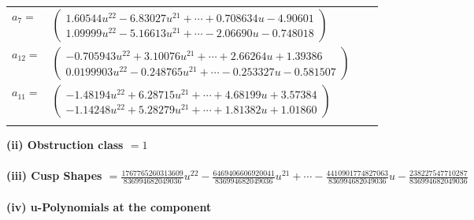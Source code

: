 \documentclass[1p]{elsarticle_modified}
\theoremstyle{definition}
\begin{document}
\begin{tabular}{m{7pt} m{180pt} m{7pt} m{180pt} }
\flushright $a_{7}=$&$\begin{pmatrix}1.60544 u^{22}-6.83027 u^{21}+\cdots+0.708634 u-4.90601\\1.09999 u^{22}-5.16613 u^{21}+\cdots-2.06690 u-0.748018\end{pmatrix}$ \\
\flushright $a_{12}=$&$\begin{pmatrix}-0.705943 u^{22}+3.10076 u^{21}+\cdots+2.66264 u+1.39386\\0.0199903 u^{22}-0.248765 u^{21}+\cdots-0.253327 u-0.581507\end{pmatrix}$ \\
\flushright $a_{11}=$&$\begin{pmatrix}-1.48194 u^{22}+6.28715 u^{21}+\cdots+4.68199 u+3.57384\\-1.14248 u^{22}+5.28279 u^{21}+\cdots+1.81382 u+1.01860\end{pmatrix}$\\&\end{tabular}
\flushleft \textbf{(ii) Obstruction class $= 1$}\\~\\
\flushleft \textbf{(iii) Cusp Shapes $= \frac{1767765260313609}{836994682049036} u^{22}-\frac{6469406606920041}{836994682049036} u^{21}+\cdots-\frac{4410901774827063}{836994682049036} u-\frac{238227547710287}{836994682049036}$}\\~\\
\newpage\renewcommand{\arraystretch}{1}
\flushleft \textbf{(iv) u-Polynomials at the component}\newline \\
\end{document}
